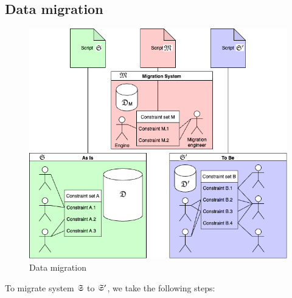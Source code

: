 \documentclass{elsarticle}
\begin{document}
\subsection{Data migration}
\begin{figure}[bht]
   \begin{center}
     \includegraphics[scale=.45]{Migration.png}
   \end{center}
\caption{Data migration}
\label{fig:event flow}
\end{figure}
   To migrate system $\mathfrak{S}$ to $\mathfrak{S}'$, we take the following steps:
\end{document}
